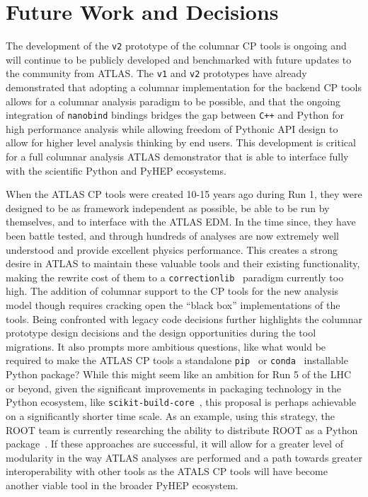 \section{Future Work and Decisions}\label{sec:conclusions}

The development of the \texttt{v2} prototype of the columnar CP tools is ongoing and will continue to be publicly developed and benchmarked with future updates to the community from ATLAS.
The \texttt{v1} and \texttt{v2} prototypes have already demonstrated that adopting a columnar implementation for the backend CP tools allows for a columnar analysis paradigm to be possible, and that the ongoing integration of \texttt{nanobind} bindings bridges the gap between \texttt{C++} and Python for high performance analysis while allowing freedom of Pythonic API design to allow for higher level analysis thinking by end users.
This development is critical for a full columnar analysis ATLAS demonstrator that is able to interface fully with the scientific Python and PyHEP ecosystems.

When the ATLAS CP tools were created 10-15 years ago during Run 1, they were designed to be as framework independent as possible, be able to be run by themselves, and to interface with the ATLAS EDM.
In the time since, they have been battle tested, and through hundreds of analyses are now extremely well understood and provide excellent physics performance.
This creates a strong desire in ATLAS to maintain these valuable tools and their existing functionality, making the rewrite cost of them to a \texttt{correctionlib}~\cite{correctionlib_2024} paradigm currently too high.
The addition of columnar support to the CP tools for the new analysis model though requires cracking open the ``black box'' implementations of the tools.
Being confronted with legacy code decisions further highlights the columnar prototype design decisions and the design opportunities during the tool migrations.
It also prompts more ambitious questions, like what would be required to make the ATLAS CP tools a standalone \texttt{pip}~\cite{pip_github} or \texttt{conda}~\cite{conda_software} installable Python package?
While this might seem like an ambition for Run 5 of the LHC or beyond, given the significant improvements in packaging technology in the Python ecosystem, like \texttt{scikit-build-core}~\cite{Schreiner_Scikit-build-core_2024}, this proposal is perhaps achievable on a significantly shorter time scale.
As an example, using this strategy, the ROOT team is currently researching the ability to distribute ROOT as a Python package~\cite{Padulano:CHEP_2024}.
If these approaches are successful, it will allow for a greater level of modularity in the way ATLAS analyses are performed and a path towards greater interoperability with other tools as the ATALS CP tools will have become another viable tool in the broader PyHEP ecosystem.
